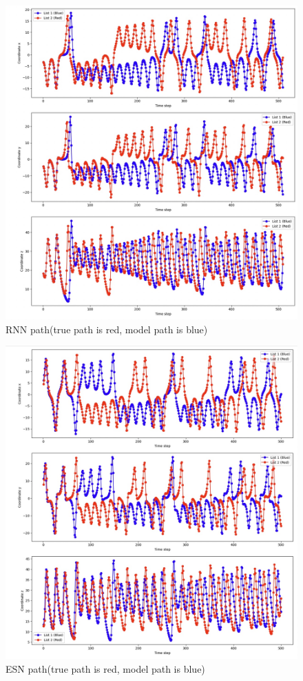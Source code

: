 \documentclass[11pt]{article}
\begin{document}
\begin{figure}[p]
    \centering
    \includegraphics[width=\textwidth]{rnn_path.jpeg}
    \caption{RNN path(true path is red, model path is blue)}
\end{figure}

\begin{figure}[p]
    \centering
    \includegraphics[width=\textwidth]{echo_path.jpeg}
    \caption{ESN path(true path is red, model path is blue)}
\end{figure}
\end{document}
